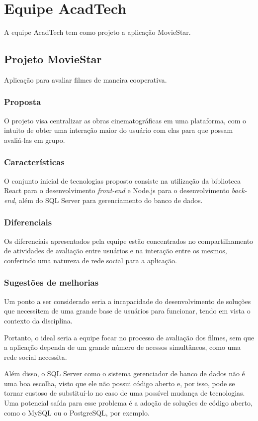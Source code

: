 \chapter[Equipe AcadTech]{Equipe AcadTech}
A equipe AcadTech tem como projeto a aplicação MovieStar.

\section{Projeto MovieStar}
Aplicação para avaliar filmes de maneira cooperativa.


\subsection{Proposta}
O projeto visa centralizar as obras cinematográficas em uma plataforma, com o intuito de obter uma interação maior do usuário com elas para que possam avaliá-las em grupo.


\subsection{Características}
O conjunto inicial de tecnologias proposto consiste na utilização da biblioteca React para o desenvolvimento \textit{front-end} e Node.js para o desenvolvimento \textit{back-end}, além do SQL Server para gerenciamento do banco de dados.

    
\subsection{Diferenciais}
Os diferenciais apresentados pela equipe estão concentrados no compartilhamento de atividades de avaliação entre usuários e na interação entre os mesmos, conferindo uma natureza de rede social para a aplicação.


\subsection{Sugestões de melhorias}
Um ponto a ser considerado seria a incapacidade do desenvolvimento de soluções que necessitem de uma grande base de usuários para funcionar, tendo em vista o contexto da disciplina.


Portanto, o ideal seria a equipe focar no processo de avaliação dos filmes, sem que a aplicação dependa de um grande número de acessos simultâneos, como uma rede social necessita.


Além disso, o SQL Server como o sistema gerenciador de banco de dados não é uma boa escolha, visto que ele não possui código aberto e, por isso, pode se tornar custoso de substituí-lo no caso de uma possível mudança de tecnologias. Uma potencial saída para esse problema é a adoção de soluções de código aberto, como o MySQL ou o PostgreSQL, por exemplo.


